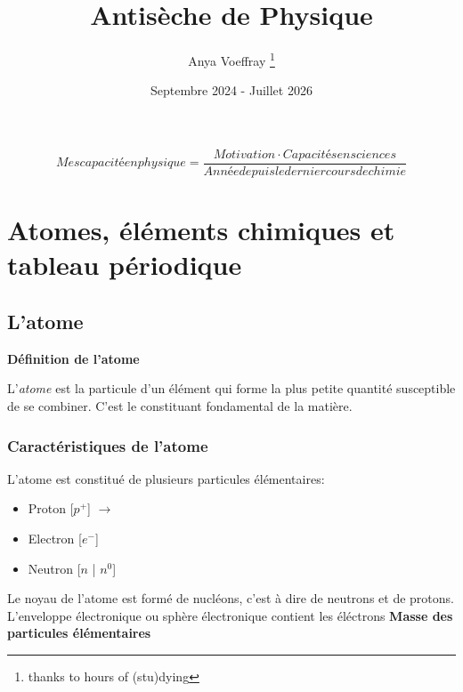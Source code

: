 \documentclass{article}
\title{Antisèche de Physique}
\author{Anya Voeffray \thanks{thanks to hours of (stu)dying}}
\date{Septembre 2024 - Juillet 2026}
\begin{document}
\begin{titlepage}
\maketitle

\begin{equation}
  Mes capacité en physique = \frac{Motivation \cdot Capacités  en  sciences}{Année  depuis  le  dernier  cours  de  chimie}
\end{equation}

\end{titlepage}


\section{Atomes, éléments chimiques et tableau périodique}

\subsection{L'atome}

\textbf{Définition de l'atome}

L'\textit{atome} est la particule d'un élément qui forme la plus petite quantité susceptible de se combiner.
C'est le constituant fondamental de la matière. 

\subsubsection{Caractéristiques de l'atome}

L'atome est constitué de plusieurs particules élémentaires:

\begin{itemize}
  \item Proton [$p^+$] $\rightarrow$ 
  \item Electron [$e^-$] \rightarrow {}
  \item Neutron [$n$ | $n^0$] \rightarrow {}
\end{itemize}

Le noyau de l'atome est formé de nucléons, c'est à dire de neutrons et de protons.
L'enveloppe électronique ou sphère électronique contient les éléctrons
\bigbreak
\textbf{Masse des particules élémentaires}
\end{document}
